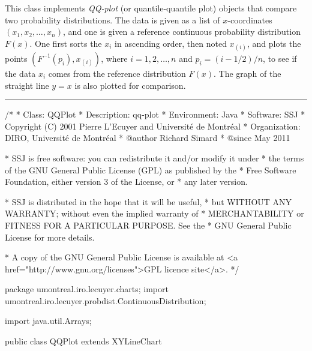 
This class implements \emph{QQ-plot} (or quantile-quantile plot)
objects that compare two probability distributions.
The data is given as a list of $x$-coordinates $(x_1, x_2, \ldots, x_{n})$,
and one is given a reference continuous probability distribution  $F(x)$.
One first sorts the $x_i$ in ascending order, then noted $x_{(i)}$, and
plots the points $(F^{-1}(p_i), x_{(i)})$, where
$i= 1, 2, \ldots, n$ and  $p_i = (i- 1/2)/n$,
to see if the data $x_i$ comes from the reference distribution  $F(x)$.
The graph of the straight line $y=x$ is also plotted for comparison.



\bigskip\hrule
\begin{code}
\begin{hide}
/*
 * Class:        QQPlot
 * Description:  qq-plot
 * Environment:  Java
 * Software:     SSJ 
 * Copyright (C) 2001  Pierre L'Ecuyer and Université de Montréal
 * Organization: DIRO, Université de Montréal
 * @author       Richard Simard
 * @since        May 2011

 * SSJ is free software: you can redistribute it and/or modify it under
 * the terms of the GNU General Public License (GPL) as published by the
 * Free Software Foundation, either version 3 of the License, or
 * any later version.

 * SSJ is distributed in the hope that it will be useful,
 * but WITHOUT ANY WARRANTY; without even the implied warranty of
 * MERCHANTABILITY or FITNESS FOR A PARTICULAR PURPOSE.  See the
 * GNU General Public License for more details.

 * A copy of the GNU General Public License is available at
   <a href="http://www.gnu.org/licenses">GPL licence site</a>.
 */
\end{hide}
package umontreal.iro.lecuyer.charts;
   import umontreal.iro.lecuyer.probdist.ContinuousDistribution;\begin{hide}
   import java.util.Arrays;
\end{hide}


public class QQPlot extends XYLineChart \begin{hide} {
   private double[][] Q;        // data points
   private double[][] Lin;      // line y = x

   private void initLinear (double a, double b)
   {
      // line y = x in [a, b] by steps of h
      int m = 100;
      double h = (b - a)/ m;
      Lin = new double[2][m+1];
      for (int i = 0; i <= m; i++)
         Lin[0][i] = Lin[1][i] = a + h * i;
   }


   private void initPoints (ContinuousDistribution dist, double[] data,
                            int numPoints)
   {
      int i;
      double p;
      Q = new double[2][numPoints];     // q_i = cdf^(-1)(p_i)

      for (i = 0; i < numPoints; i++)
         Q[1][i] = data[i];
      Arrays.sort(Q[1]);
      for (i = 0; i < numPoints; i++) {
         p = (i + 0.5)/numPoints;
         Q[0][i] = dist.inverseF(p);
      }
   }\end{hide}
\end{code}

